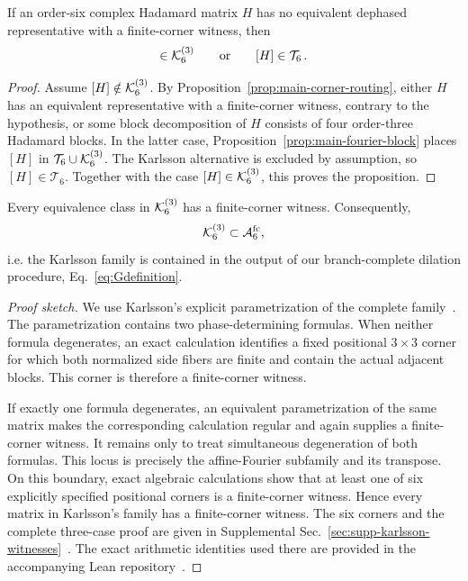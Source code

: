 \begin{proposition}
\label{thm:finitecornerintro}
If an order-six complex Hadamard matrix $H$ has no equivalent dephased representative with a finite-corner witness, then
\begin{equation}
[H]\in\KK_6^{(3)}
\qquad\text{or}\qquad
[H]\in\mathcal T_6 \,.
\label{eq:failed-search-routing}
\end{equation}
\end{proposition}

\begin{proof}
Assume $[H]\notin\mathcal K_6^{(3)}$. By
Proposition~\ref{prop:main-corner-routing}, either $H$ has an equivalent representative with a finite-corner witness, contrary to the hypothesis, or some block decomposition of $H$ consists of four order-three Hadamard blocks. In the latter case, Proposition~\ref{prop:main-fourier-block} places
$[H]$ in
$\mathcal T_6\cup\mathcal K_6^{(3)}$. The Karlsson alternative is excluded by assumption, so
$[H]\in\mathcal T_6$. 
Together with the case $[H]\in\mathcal K_6^{(3)}$, this proves the proposition.
\end{proof}

\begin{proposition}
\label{prop:karlsson-finite-corner}
Every equivalence class in $\mathcal K_6^{(3)}$ has a finite-corner witness. Consequently,
\begin{equation}
\mathcal K_6^{(3)}\subset\mathcal A_6^{\mathrm{fc}},
\label{eq:karlsson-finite-corner-main}
\end{equation}
i.e. the Karlsson family is contained in the output of our branch-complete dilation procedure, Eq.~\eqref{eq:Gdefinition}.
\end{proposition}

\begin{proof}[Proof sketch]
We use Karlsson's explicit parametrization of the complete
family~\cite{Karlsson2011H2,Karlsson2011ThreeParameter}. The parametrization contains two phase-determining formulas. When neither formula degenerates, an exact calculation identifies a fixed positional $3\times3$ corner for which both normalized side fibers are finite and contain the actual adjacent blocks. This corner is therefore a finite-corner witness.

If exactly one formula degenerates, an equivalent parametrization of the same matrix makes the corresponding calculation regular and again supplies a finite-corner witness. It remains only to treat simultaneous degeneration of both formulas. This locus is precisely the affine-Fourier subfamily and its transpose. On this boundary, exact algebraic calculations show that at least one of six explicitly specified positional corners is a finite-corner witness. Hence every matrix in Karlsson's family has a finite-corner witness. The six corners and the complete three-case proof are given in Supplemental Sec.~\ref{sec:supp-karlsson-witnesses}~\cite{SupplementalMaterial}. The exact arithmetic identities used there are provided in the accompanying Lean repository~\cite{CardenesWuttig2026HadamardRepository}.
\end{proof}

